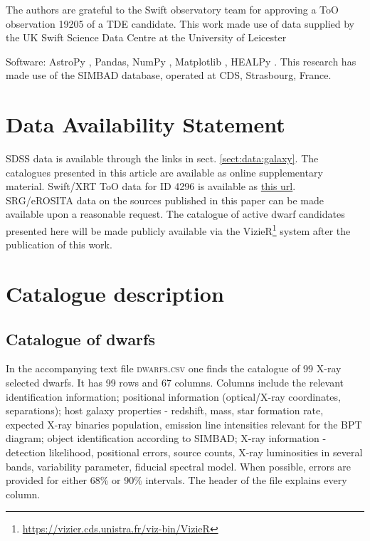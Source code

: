 \documentclass[fleqn,usenatbib]{mnras}
\begin{document}
The authors are grateful to the Swift observatory team for approving a ToO observation 19205 of a TDE candidate. This work made use of data supplied by the UK Swift Science Data Centre at the University of Leicester


Software: AstroPy \citep{astropy:2018}, Pandas\citep{reback2020pandas},  NumPy \citep{Harris2020}, Matplotlib \citep{Hunter2007}, HEALPy \citep{Zonca2019}. 
This research has made use of the SIMBAD database,
operated at CDS, Strasbourg, France.


\section*{Data Availability Statement}
SDSS data is available through the links in sect. \ref{sect:data:galaxy}.
The catalogues presented in this article are available as online supplementary material.
Swift/XRT ToO data for ID 4296 is available as \href{https://swift.gsfc.nasa.gov/cgi-bin/sdc/list?seq=sw00016191001.017}{this url}.
SRG/eROSITA data on  the sources published in this paper can be made available upon a reasonable request.
The catalogue of active dwarf candidates presented here will be made publicly available via the VizieR\footnote{\url{https://vizier.cds.unistra.fr/viz-bin/VizieR}} system after  the publication of this work.
 








\appendix
\section{Catalogue description}
\subsection{Catalogue of dwarfs}
\label{appendix:catalog}


In the accompanying text file \textsc{dwarfs.csv} one finds the catalogue of 99 X-ray selected dwarfs. It has 99 rows and 67 columns. Columns include the relevant identification information; positional information (optical/X-ray coordinates, separations); host galaxy properties - redshift, mass, star formation rate, expected X-ray binaries population, emission line intensities relevant for the BPT diagram; object identification according to SIMBAD; X-ray information - detection likelihood, positional errors, source counts, X-ray luminosities in several bands, variability parameter, fiducial spectral model. When possible, errors are provided for either 68\% or 90\% intervals. The header of the file explains every column.
\end{document}
